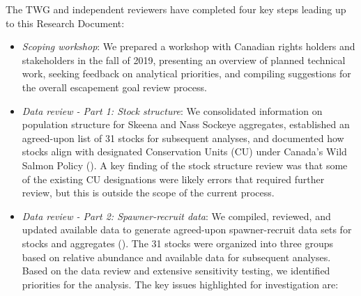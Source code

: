 \documentclass[french,11pt]{book}
\begin{document}
The TWG and independent reviewers have completed four key steps leading up to this Research Document:
\begin{itemize}

\item
  \emph{Scoping workshop}: We prepared a workshop with Canadian rights holders and stakeholders in the fall of 2019, presenting an overview of planned technical work, seeking feedback on analytical priorities, and compiling suggestions for the overall escapement goal review process.
\item
  \emph{Data review - Part 1: Stock structure}: We consolidated information on population structure for Skeena and Nass Sockeye aggregates, established an agreed-upon list of 31 stocks for subsequent analyses, and documented how stocks align with designated Conservation Units (CU) under Canada's Wild Salmon Policy (). A key finding of the stock structure review was that some of the existing CU designations were likely errors that required further review, but this is outside the scope of the current process.
\item
  \emph{Data review - Part 2: Spawner-recruit data}: We compiled, reviewed, and updated available data to generate agreed-upon spawner-recruit data sets for stocks and aggregates (). The 31 stocks were organized into three groups based on relative abundance and available data for subsequent analyses. Based on the data review and extensive sensitivity testing, we identified priorities for the analysis. The key issues highlighted for investigation are:
  \begin{enumerate}
  \def\labelenumi{\arabic{enumi}.}


\end{enumerate}
\end{itemize}
\end{document}
